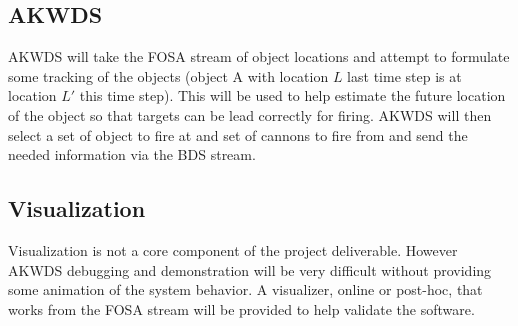 \subsection{AKWDS}
AKWDS will take the FOSA stream of object locations and attempt to formulate some tracking of the objects (object A with location $L$ last time step is at location $L'$ this time step). This will be used to help estimate the future location of the object so that targets can be lead correctly for firing. AKWDS will then select a set of object to fire at and set of cannons to fire from and send the needed information via the BDS stream.

\subsection{Visualization}
Visualization is not a core component of the project deliverable. However AKWDS debugging and demonstration will be very difficult without providing some animation of the system behavior. A visualizer, online or post-hoc, that works from the FOSA stream will be provided to help validate the software.